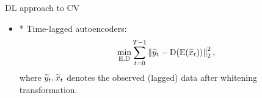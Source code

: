 \documentclass{beamer}
\begin{document}
\begin{frame}{DL approach to CV}
	\begin{itemize}
		\item * Time-lagged autoencoders\footnotemark:
		\begin{equation}
			\min_{\operatorname{E}, \operatorname{D}} \sum_{t=0}^{T-1} \left\| \widetilde y_t - \operatorname{D}(\operatorname{E}(\widetilde x_t)) \right\|_2^2,
		\end{equation}
		where $\widetilde y_t, \widetilde x_t$ denotes the observed (lagged) data after whitening
		transformation. 
	\end{itemize}
\end{frame}
\end{document}
